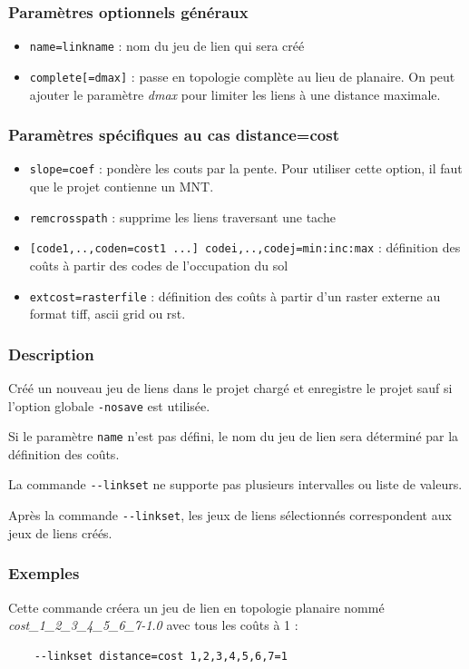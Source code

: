 \documentclass[a4paper,10pt]{report}
\begin{document}
\subsubsection{Paramètres optionnels généraux}
\begin{itemize}
	\item \verb|name=linkname| : nom du jeu de lien qui sera créé
	\item \verb|complete[=dmax]| : passe en topologie complète au lieu de planaire. On peut ajouter le paramètre \textit{dmax} pour limiter les liens à une distance maximale.
\end{itemize}

\subsubsection{Paramètres spécifiques au cas distance=cost}
\begin{itemize}
	\item \verb|slope=coef| : pondère les couts par la pente. Pour utiliser cette option, il faut que le projet contienne un MNT.
	\item \verb|remcrosspath| : supprime les liens traversant une tache
	\item \verb|[code1,..,coden=cost1 ...] codei,..,codej=min:inc:max| : définition des coûts à partir des codes de l'occupation du sol
	\item \verb|extcost=rasterfile| : définition des coûts à partir d'un raster externe au format tiff, ascii grid ou rst.
\end{itemize}

\subsubsection{Description}
Créé un nouveau jeu de liens dans le projet chargé et enregistre le projet sauf si l'option globale \verb|-nosave| est utilisée.

Si le paramètre \verb|name| n'est pas défini, le nom du jeu de lien sera déterminé par la définition des coûts.

La commande \verb|--linkset| ne supporte pas plusieurs intervalles ou liste de valeurs.

Après la commande \verb|--linkset|, les jeux de liens sélectionnés correspondent aux jeux de liens créés.

\subsubsection{Exemples}
Cette commande créera un jeu de lien en topologie planaire nommé \textit{cost\_1\_2\_3\_4\_5\_6\_7-1.0} avec tous les coûts à 1 :
\begin{Verbatim}
	--linkset distance=cost 1,2,3,4,5,6,7=1
\end{Verbatim}
\end{document}
